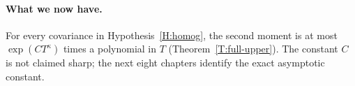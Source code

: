\paragraph{What we now have.}
For every covariance in Hypothesis~\ref{H:homog}, the second moment is at most
$\exp(CT^\kappa)$ times a polynomial in $T$ (Theorem~\ref{T:full-upper}). The
constant $C$ is not claimed sharp; the next eight chapters identify the exact
asymptotic constant.
